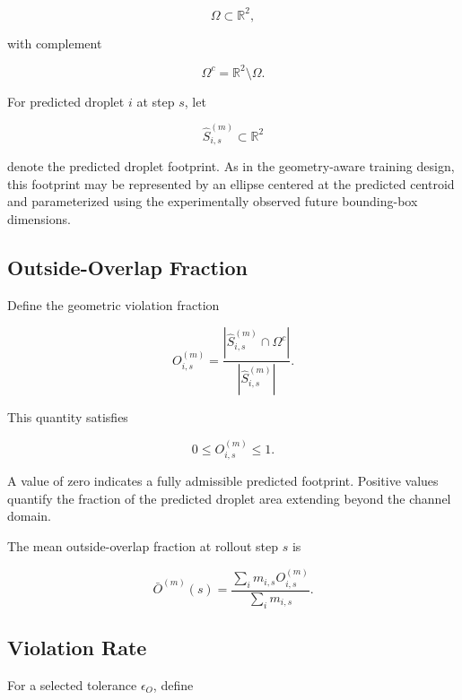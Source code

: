 \documentclass[11pt]{article}
\newcommand{\R}{\mathbb{R}}
\begin{document}
\begin{equation}
\Omega \subset \R^2,
\end{equation}

with complement

\begin{equation}
\Omega^c
=
\R^2\setminus\Omega.
\end{equation}

For predicted droplet \(i\) at step \(s\), let

\begin{equation}
\widehat{S}_{i,s}^{(m)}
\subset \R^2
\end{equation}

denote the predicted droplet footprint. As in the geometry-aware training design, this footprint may be represented by an ellipse centered at the predicted centroid and parameterized using the experimentally observed future bounding-box dimensions.

\subsection{Outside-Overlap Fraction}

Define the geometric violation fraction

\begin{equation}
O_{i,s}^{(m)}
=
\frac{
\left|
\widehat{S}_{i,s}^{(m)}
\cap
\Omega^c
\right|
}{
\left|
\widehat{S}_{i,s}^{(m)}
\right|
}.
\end{equation}

This quantity satisfies

\begin{equation}
0 \le O_{i,s}^{(m)} \le 1.
\end{equation}

A value of zero indicates a fully admissible predicted footprint. Positive values quantify the fraction of the predicted droplet area extending beyond the channel domain.

The mean outside-overlap fraction at rollout step \(s\) is

\begin{equation}
\bar{O}^{(m)}(s)
=
\frac{
\sum_i m_{i,s}
O_{i,s}^{(m)}
}{
\sum_i m_{i,s}
}.
\end{equation}

\subsection{Violation Rate}

For a selected tolerance \(\epsilon_O\), define
\end{document}
